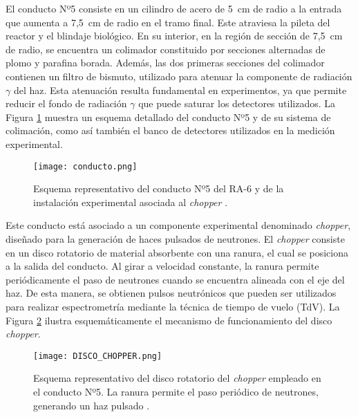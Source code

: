 El conducto Nº5 consiste en un cilindro de acero de 5~cm de radio a la entrada que aumenta a 7,5~cm de radio en el tramo final. Este atraviesa la pileta del reactor y el blindaje biológico. En su interior, en la región de sección de 7,5~cm de radio, se encuentra un colimador constituido por secciones alternadas de plomo y parafina borada. Además, las dos primeras secciones del colimador contienen un filtro de bismuto, utilizado para atenuar la componente de radiación $\gamma$ del haz. Esta atenuación resulta fundamental en experimentos, ya que permite reducir el fondo de radiación $\gamma$ que puede saturar los detectores utilizados. La Figura \ref{fig:conducto} muestra un esquema detallado del conducto Nº5 y de su sistema de colimación, como así también el banco de detectores utilizados en la medición experimental.

\begin{figure}[h]
\centering
\texttt{[image: conducto.png]}
\caption[Esquema representativo del conducto Nº5 del RA-6 y de la instalación experimental asociada al \textit{chopper}.]{Esquema representativo del conducto Nº5 del RA-6 y de la instalación experimental asociada al \textit{chopper} \cite{DeptoNeutronesCAB2025}.}
\label{fig:conducto}
\end{figure}

Este conducto está asociado a un componente experimental denominado \textit{chopper}, diseñado para la generación de haces pulsados de neutrones. El \textit{chopper} consiste en un disco rotatorio de material absorbente con una ranura, el cual se posiciona a la salida del conducto. Al girar a velocidad constante, la ranura permite periódicamente el paso de neutrones cuando se encuentra alineada con el eje del haz. De esta manera, se obtienen pulsos neutrónicos que pueden ser utilizados para realizar espectrometría mediante la técnica de tiempo de vuelo (TdV). La Figura \ref{fig:chopper} ilustra esquemáticamente el mecanismo de funcionamiento del disco \textit{chopper}.

\begin{figure}[h]
\centering
\texttt{[image: DISCO\_CHOPPER.png]}
\caption[Esquema representativo del disco rotatorio del \textit{chopper} empleado en el conducto Nº5. La ranura permite el paso periódico de neutrones, generando un haz pulsado.]{Esquema representativo del disco rotatorio del \textit{chopper} empleado en el conducto Nº5. La ranura permite el paso periódico de neutrones, generando un haz pulsado \cite{Schmidt2021Chopper}.}
\label{fig:chopper}
\end{figure}

